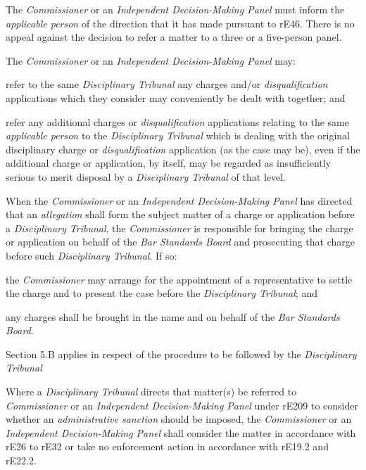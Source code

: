 The \emph{Commissioner }or an \emph{Independent Decision-Making
Panel }must inform the \emph{applicable person} of the direction that it
has made pursuant to rE46. There is no appeal against the decision to
refer a matter to a three or a five-person panel.\\
\par
The \emph{Commissioner }or an \emph{Independent Decision-Making
Panel }may:\\\nl \item refer to the same \emph{Disciplinary Tribunal} any charges
and/or \emph{disqualification} applications which they consider may
conveniently be dealt with together; and\item refer any additional charges or \emph{disqualification} applications
relating to the same \emph{applicable person} to the \emph{Disciplinary
Tribunal} which is dealing with the original disciplinary charge
or \emph{disqualification} application (as the case may be), even if the
additional charge or application, by itself, may be regarded as
insufficiently serious to merit disposal by a \emph{Disciplinary
Tribunal} of that level.\ln
{}\par
When the \emph{Commissioner }or an \emph{Independent Decision-Making
Panel }has directed that an \emph{allegation} shall form the subject
matter of a charge or application before a \emph{Disciplinary Tribunal},
the \emph{Commissioner} is responsible for bringing the charge or
application on behalf of the \emph{Bar Standards Board} and prosecuting
that charge before such \emph{Disciplinary Tribunal}. If so:\\\nl \item the \emph{Commissioner} may arrange for the appointment of a
representative to settle the charge and to present the case before
the \emph{Disciplinary Tribunal}; and\item any charges shall be brought in the name and on behalf of
the \emph{Bar Standards Board}.\ln
{}\par
Section 5.B applies in respect of the procedure to be followed by
the \emph{Disciplinary Tribunal}\par
{}\par
Where a \emph{Disciplinary Tribunal} directs that matter(s) be referred
to \emph{Commissioner }or an \emph{Independent Decision-Making
Panel }under rE209 to consider whether an \emph{administrative
sanction} should be imposed, the \emph{Commissioner }or
an \emph{Independent Decision-Making Panel }shall consider the matter in
accordance with rE26 to rE32 or take no enforcement action in accordance
with rE19.2 and rE22.2.\\

